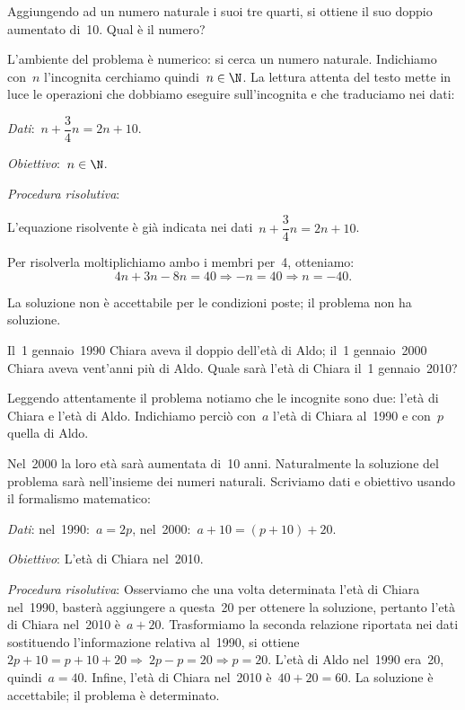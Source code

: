 \begin{problema}
 Aggiungendo ad un numero naturale i suoi tre quarti, si ottiene il suo
doppio aumentato di~10. Qual è il numero?
\end{problema}

\begin{soluzione}
L'ambiente del problema è numerico: si cerca un numero
naturale. Indichiamo con~\(n\) l'incognita
cerchiamo quindi~\(n\in\N\). La lettura attenta del testo mette
in luce le operazioni che dobbiamo eseguire
sull'incognita e che traduciamo nei dati:

\emph{Dati}:~\(n+\dfrac{3}{4}n=2n+10\).

\emph{Obiettivo}:~\(n\in\N\).

\emph{Procedura risolutiva}:

L'equazione risolvente è già indicata nei dati~\(n+\dfrac{3}{4}n=2n+10\).

Per risolverla moltiplichiamo ambo i membri per~4, otteniamo:
\[4n+3n-8n=40\Rightarrow -n=40\Rightarrow n=-40.\]

La soluzione non è accettabile per le condizioni poste; il problema
non ha soluzione.
\end{soluzione}

\begin{problema}
 Il~1{\textdegree} gennaio~1990 Chiara aveva il doppio
dell'età di Aldo; il~1{\textdegree} gennaio~2000
Chiara aveva vent'anni più di Aldo. Quale sarà
l'età di Chiara il~1{\textdegree} gennaio~2010?
\end{problema}

\begin{soluzione}
Leggendo attentamente il problema notiamo che le incognite sono due:
l'età di Chiara e l'età di Aldo.
Indichiamo perciò con~\(a\) l'età di
Chiara al~1990 e con~\(p\) quella di Aldo.

Nel~2000 la loro età sarà aumentata di~10 anni. Naturalmente la
soluzione del problema sarà nell'insieme dei numeri
naturali. Scriviamo dati e obiettivo usando il formalismo matematico:

\emph{Dati}: nel~1990:~\(a=2p\), nel~2000:~\(a+10=(p+10)+20\).

\emph{Obiettivo}: L'età di Chiara nel~2010.

\emph{Procedura risolutiva}:
Osserviamo che una volta determinata l'età di Chiara
nel~1990, basterà aggiungere a questa~20 per ottenere la soluzione,
pertanto l'età di Chiara nel~2010 è~\(a+20\).
Trasformiamo la seconda relazione riportata nei dati sostituendo
l'informazione relativa al~1990,
si ottiene~\(2p+10=p+10+20\Rightarrow~2p-p=20\Rightarrow p=20.\)
L'età di Aldo nel~1990 era~20, quindi~\(a=40\).
Infine, l'età di Chiara nel~2010 è~\(40+20=60\).
La soluzione è accettabile; il problema è determinato.
\end{soluzione}

